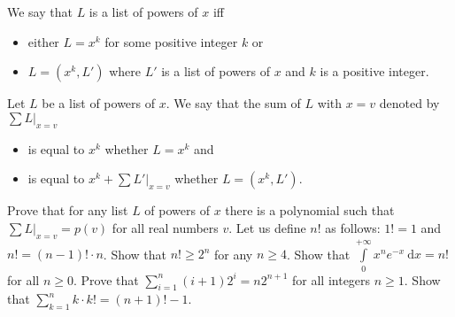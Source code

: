 \begin{chapterendexercises}
  \exercise We say that $L$ is a list of powers of $x$ iff
    \begin{itemize}
      \item either $L = x^k$ for some positive integer $k$ or
      \item $L = (x^k, L')$ where $L'$ is a list of powers of $x$ and
        $k$ is a positive integer.
    \end{itemize}

    Let $L$ be a list of powers of $x$. We say that the sum of $L$
    with $x = v$ denoted by $\sum L\big\rvert_{x = v}$
    \begin{itemize}
      \item is equal to $x^k$ whether $L = x^k$ and
      \item is equal to $x^k + \sum L'\big\rvert_{x = v}$ whether
        $L = (x^k, L')$.
    \end{itemize}

    Prove that for any list $L$ of powers of $x$ there is a polynomial such that
    $\sum L\big\rvert_{x = v} = p(v)$ for all real numbers $v$.
  \exercise Let us define $n!$ as follows: $1! = 1$ and
    $n! = (n - 1)! \cdot n$. Show that $n! \ge 2^n$ for any $n \ge 4$.
  \exercise Show that
    $\int\limits_0^{+\infty} x^n e^{- x} ~ \mathrm{d}x = n!$
    for all $n \ge 0$.
  \exercise Prove that $\sum_{i = 1}^n (i + 1) 2^i = n 2^{n + 1}$
    for all integers $n \ge 1$.
  \exercise Show that $\sum_{k = 1}^n k \cdot k! = (n + 1)! - 1$.
\end{chapterendexercises}
